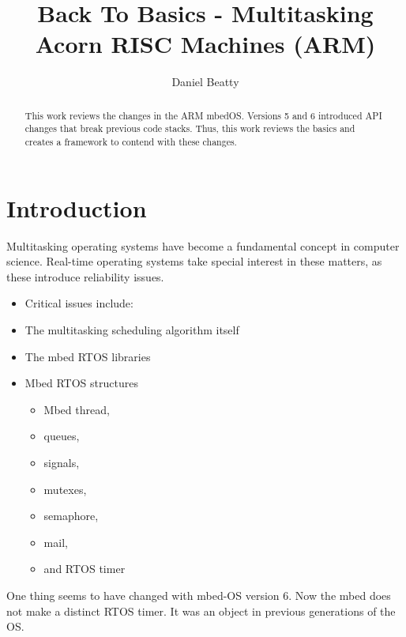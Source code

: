 \documentclass{article}
\title{Back To Basics - Multitasking Acorn RISC Machines (ARM)}
\author{Daniel Beatty}
\begin{document}
\maketitle

\begin{abstract}
    This work reviews the changes in the ARM mbedOS.  Versions 5 and 6 introduced API changes that break previous code stacks.  Thus, this work reviews the basics and creates a framework to contend with these changes.
\end{abstract}

\section{Introduction}

Multitasking operating systems have become a fundamental concept in computer science.  Real-time operating systems take special interest in these matters, as these introduce reliability issues.  

\begin{itemize}

	\item Critical issues include:

	\item The multitasking scheduling algorithm itself

	\item The mbed RTOS libraries
	\item Mbed RTOS structures
	\begin{itemize}

		\item Mbed thread,

		\item queues,

		\item signals,

		\item mutexes,

		\item semaphore,

		\item mail,

		\item and RTOS timer

	\end{itemize}
	

\end{itemize}


One thing seems to have changed with mbed-OS version 6.  Now the mbed does not make a distinct RTOS timer.  It was an object in previous generations of the OS.  
\end{document}
